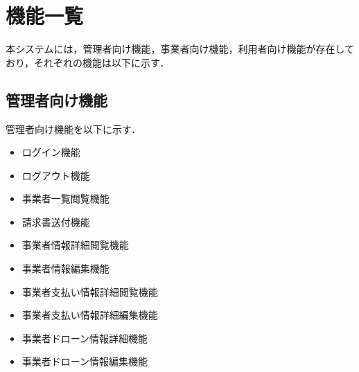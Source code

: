 \documentclass[a4paper, titlepage]{jsarticle}
\begin{document}
\section{機能一覧}
本システムには，管理者向け機能，事業者向け機能，利用者向け機能が存在しており，それぞれの機能は以下に示す．

\subsection{管理者向け機能}
管理者向け機能を以下に示す．
\begin{itemize}[labelwidth=\linewidth]
  \setlength{\leftskip}{1em}

  \item ログイン機能 %
  \item ログアウト機能 %

  \item 事業者一覧閲覧機能 %
  \item 請求書送付機能 %
  \item 事業者情報詳細閲覧機能 %
  \item 事業者情報編集機能 %
  \item 事業者支払い情報詳細閲覧機能 %
  \item 事業者支払い情報詳細編集機能 %
  \item 事業者ドローン情報詳細機能 %
  \item 事業者ドローン情報編集機能 %


\end{itemize}
\end{document}
